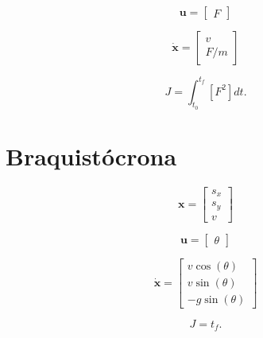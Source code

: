 \begin{equation}
    \mathbf{u} = \left[
        \begin{aligned}
            F
        \end{aligned}
    \right]
\end{equation}

\begin{equation}
    \dot{\mathbf{x}} = \left[
        \begin{aligned}
            v \\
            F/m
        \end{aligned}
    \right]
\end{equation}

\begin{equation}
    J = \int_{t_0}^{t_f} \left[ F^2 \right] dt.
\end{equation}

\section{Braquistócrona}
\label{sec:braquistocrona}

\begin{equation}
    \mathbf{x} = \left[
        \begin{aligned}
            s_x \\
            s_y \\
            v
        \end{aligned}
    \right]
\end{equation}

\begin{equation}
    \mathbf{u} = \left[
        \begin{aligned}
            \theta
        \end{aligned}
    \right]
\end{equation}

\begin{equation}
    \dot{\mathbf{x}} = \left[
        \begin{aligned}
            v \cos(\theta) \\
            v \sin(\theta) \\
            -g \sin(\theta)
        \end{aligned}
    \right]
\end{equation}

\begin{equation}
    J = t_f.
\end{equation}

